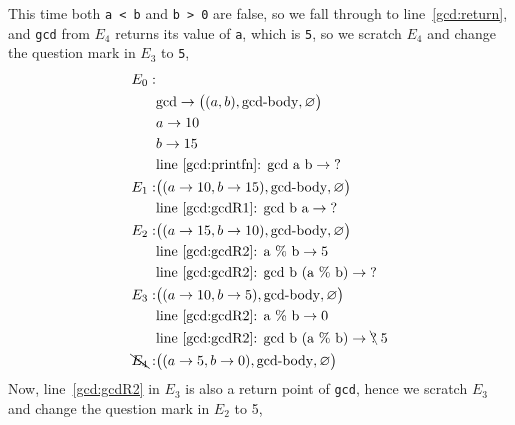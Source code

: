 \documentclass[fsharpnotes.tex]{subfiles}
\begin{document}
This time both \lstinline!a < b! and \lstinline!b > 0! are false, so we fall through to line~\ref{gcd:return}, and \lstinline!gcd! from $E_4$ returns its value of \lstinline!a!, which is \lstinline!5!, so we scratch $E_4$ and change the question mark in $E_3$ to \lstinline!5!,
\begin{align*}
  E_0:&\\
      & \text{gcd} \rightarrow \big((a, b), \text{gcd-body}, \varnothing\big)\\
      & a \rightarrow 10\\
      & b \rightarrow 15\\
      & \text{line~\ref{gcd:printfn}: gcd a b} \rightarrow \text{?}\\
  E_1:& \big((a \rightarrow 10, b \rightarrow 15), \text{gcd-body}, \varnothing\big)\\
      & \text{line~\ref{gcd:gcdR1}: gcd b a} \rightarrow \text{?}\\
  E_2:& \big((a \rightarrow 15, b \rightarrow 10), \text{gcd-body}, \varnothing\big)\\
      & \text{line~\ref{gcd:gcdR2}: a \% b} \rightarrow 5\\
      & \text{line~\ref{gcd:gcdR2}: gcd b (a \% b)} \rightarrow \text{?}\\
  E_3:& \big((a \rightarrow 10, b \rightarrow 5), \text{gcd-body}, \varnothing\big)\\
      & \text{line~\ref{gcd:gcdR2}: a \% b} \rightarrow 0\\
      & \text{line~\ref{gcd:gcdR2}: gcd b (a \% b)} \rightarrow \bcancel{\text{?}}\; 5\\
  \bcancel{E_4}:& \big((a \rightarrow 5, b \rightarrow 0), \text{gcd-body}, \varnothing\big)\\
\end{align*}
Now, line~\ref{gcd:gcdR2} in $E_3$ is also a return point of \lstinline!gcd!, hence we scratch $E_3$ and change the question mark in $E_2$ to 5,
\end{document}
